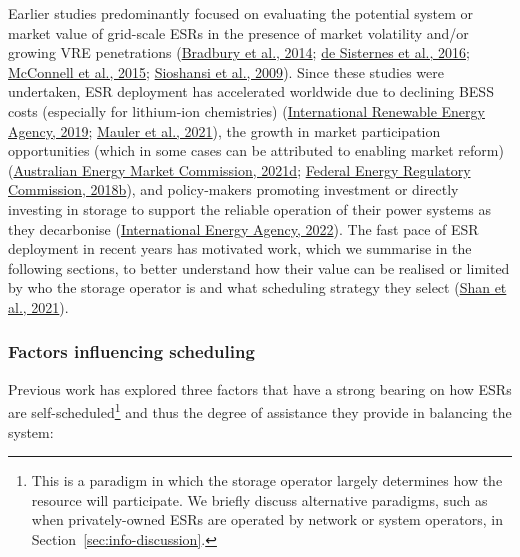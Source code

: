 \documentclass[12pt,a4paper,]{report}
\begin{document}
Earlier studies predominantly focused on evaluating the potential system
or market value of grid-scale ESRs in the presence of market volatility
and/or growing VRE penetrations
(\protect\hyperlink{ref-bradburyEconomicViabilityEnergy2014}{Bradbury et
al., 2014}; \protect\hyperlink{ref-desisternesValueEnergyStorage2016}{de
Sisternes et al., 2016};
\protect\hyperlink{ref-mcconnellEstimatingValueElectricity2015}{McConnell
et al., 2015};
\protect\hyperlink{ref-sioshansiEstimatingValueElectricity2009}{Sioshansi
et al., 2009}). Since these studies were undertaken, ESR deployment has
accelerated worldwide due to declining BESS costs (especially for
lithium-ion chemistries)
(\protect\hyperlink{ref-internationalrenewableenergyagencyUtilityscaleBatteriesInnovation2019}{International
Renewable Energy Agency, 2019};
\protect\hyperlink{ref-maulerBatteryCostForecasting2021}{Mauler et al.,
2021}), the growth in market participation opportunities (which in some
cases can be attributed to enabling market reform)
(\protect\hyperlink{ref-australianenergymarketcommissionIntegratingEnergyStorage2021}{Australian
Energy Market Commission, 2021d};
\protect\hyperlink{ref-federalenergyregulatorycommissionOrderNo8412018}{Federal
Energy Regulatory Commission, 2018b}), and policy-makers promoting
investment or directly investing in storage to support the reliable
operation of their power systems as they decarbonise
(\protect\hyperlink{ref-internationalenergyagencyGridScaleStorage2022}{International
Energy Agency, 2022}). The fast pace of ESR deployment in recent years
has motivated work, which we summarise in the following sections, to
better understand how their value can be realised or limited by who the
storage operator is and what scheduling strategy they select
(\protect\hyperlink{ref-shanDeleteriousEffectsStrategic2021}{Shan et
al., 2021}).

\hypertarget{sec:info-context-esr-operation}{%
\subsubsection{Factors influencing
scheduling}\label{sec:info-context-esr-operation}}

Previous work has explored three factors that have a strong bearing on
how ESRs are self-scheduled\footnote{This is a paradigm in which the
  storage operator largely determines how the resource will participate.
  We briefly discuss alternative paradigms, such as when privately-owned
  ESRs are operated by network or system operators, in
  Section~\ref{sec:info-discussion}.} and thus the degree of assistance
they provide in balancing the system:
\end{document}
